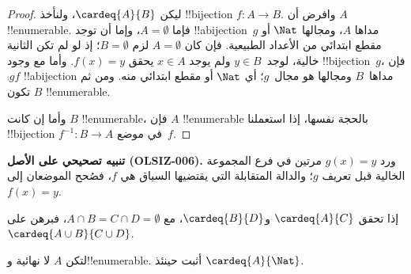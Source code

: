 \documentclass[../../../include/open-logic-section]{subfiles}
\begin{document}
\begin{proof}
ليكن $\cardeq{A}{B}$، ولنأخذ !!{bijection} $f \colon A
\to B$. وافرض أن $A$ !!{enumerable}.
{
فإما $A  = \emptyset$، وإما أن توجد !!a{bijection}~$g$ مداها $A$، ومجالها $\Nat$ أو مقطع ابتدائي من الأعداد الطبيعية. فإن كان $A = \emptyset$ لزم $B =
\emptyset$؛ إذ لو لم تكن الثانية خالية، لوجد~$y \in B$ ولم يوجد $x
\in A$ يحقق $f(x) = y$. وأما مع وجود !!{bijection}~$g$، فإن $\comp{g}{f}$ !!a{bijection} مداها~$B$ ومجالها هو مجال~$g$؛ أي $\Nat$ أو مقطع ابتدائي منه. ومن ثم تكون $B$ !!{enumerable}.}

وأما إن كانت $B$ !!{enumerable}، فإن $A$ !!{enumerable} بالحجة نفسها، إذا استعملنا !!{bijection} $f^{-1}\colon B \to A$ في موضع~$f$.
\end{proof}

\begin{editorial}
\textbf{تنبيه تصحيحي على الأصل (OLSIZ-006).}
ورد $g(x)=y$ مرتين في فرع المجموعة الخالية قبل تعريف $g$؛ والدالة
المتقابلة التي يقتضيها السياق هي $f$، فصُحح الموضعان إلى $f(x)=y$.
\end{editorial}

\begin{prob}
إذا تحقق $\cardeq{A}{C}$ و$\cardeq{B}{D}$، مع $A \cap B =
C \cap D = \emptyset$، فبرهن على $\cardeq{A \cup B}{C \cup D}$.
\end{prob}

\begin{prob}
لتكن $A$ لا نهائية و!!{enumerable}. أثبت حينئذ $\cardeq{A}{\Nat}$.
\end{prob}
\end{document}
